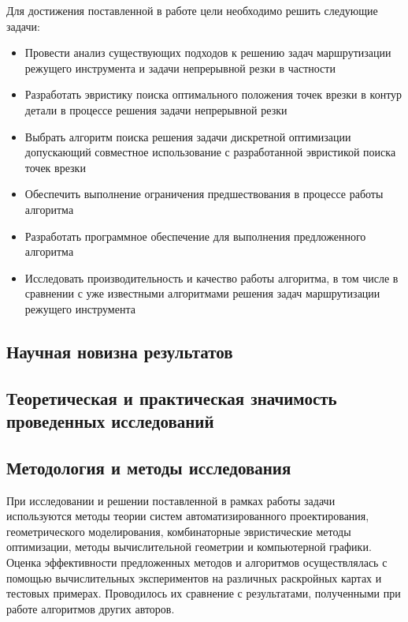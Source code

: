 \documentclass[14pt]{extarticle}
\theoremstyle{plain}%
\theoremstyle{remark}
\begin{document}
Для достижения поставленной в работе цели необходимо решить следующие задачи:
\begin{itemize}
  \item
  Провести анализ существующих подходов к решению
  задач маршрутизации режущего инструмента
  и задачи непрерывной резки в частности
  \item
  Разработать эвристику поиска оптимального положения
  точек врезки в контур детали в процессе решения задачи
  непрерывной резки
  \item
  Выбрать алгоритм поиска решения задачи дискретной оптимизации
  допускающий совместное использование
  с разработанной эвристикой поиска точек врезки
  \item
  Обеспечить выполнение ограничения предшествования
  в процессе работы алгоритма
  \item
  Разработать программное обеспечение для
  выполнения предложенного алгоритма
  \item
  Исследовать производительность и качество работы
  алгоритма,
  в том числе в сравнении с уже известными
  алгоритмами решения задач
  маршрутизации режущего инструмента
\end{itemize}

\subsection*{Научная новизна результатов}

\subsection*{Теоретическая и практическая значимость проведенных исследований}

\subsection*{Методология и методы исследования}

При исследовании и решении поставленной в рамках работы задачи
используются методы теории систем автоматизированного проектирования,
геометрического моделирования, комбинаторные эвристические методы
оптимизации, методы вычислительной геометрии и компьютерной графики.
Оценка эффективности предложенных
методов и алгоритмов осуществлялась с помощью вычислительных экспериментов
на различных раскройных картах и тестовых примерах.
Проводилось их сравнение с результатами,
полученными при работе алгоритмов
других авторов.
\end{document}

